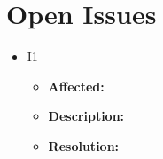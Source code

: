 \chapter{Open Issues}

\begin{itemize}
    \item I1
    \begin{itemize}
        \item \textbf{Affected:} 
        \item \textbf{Description:} 
        \item \textbf{Resolution:}  
    \end{itemize}
\end{itemize}

% 
